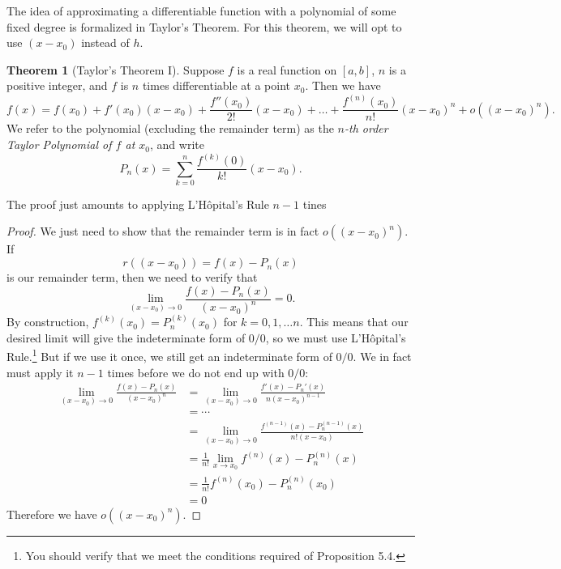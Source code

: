 \documentclass{article}
\theoremstyle{definition}
\newtheorem{theorem}{Theorem}[section]
\begin{document}
	The idea of approximating a differentiable function with a polynomial of some fixed degree is formalized in Taylor's Theorem. For this theorem, we will opt to use $ (x-x_0) $ instead of $ h $.
	\begin{theorem}[Taylor's Theorem I]
		Suppose $ f $ is a real function on $ [a,b] $, $ n $ is a positive integer, and $ f $ is $ n $ times differentiable at a point $ x_0 $. Then we have $$ f(x)=f(x_0)+f'(x_0)(x-x_0)+\frac{f''(x_0)}{2!}(x-x_0)+\ldots+\frac{f^{(n)}(x_0)}{n!}(x-x_0)^n+o((x-x_0)^n).$$ We refer to the polynomial (excluding the remainder term) as the \textit{\color{red}$ n $-th order Taylor Polynomial of $ f $ at $ x_0 $}, and write $$ P_n(x)=\sum_{k=0}^{n}\frac{f^{(k)}(0)}{k!}(x-x_0) .$$
	\end{theorem}
	The proof just amounts to applying L'H\^{o}pital's Rule $ n-1 $ tines
	\begin{proof}
		We just need to show that the remainder term is in fact $ o((x-x_0)^n) $. If $$ r((x-x_0))=f(x)-P_n(x) $$ is our remainder term, then we need to verify that $$ \lim\limits_{(x-x_0)\to 0}\frac{f(x)-P_n(x)}{(x-x_0)^n}=0.$$ By construction, $ f^{(k)}(x_0)=P_n^{(k)}(x_0) $ for $ k=0,1,\ldots n $. This means that our desired limit will give the indeterminate form of $ 0/0 $, so we must use L'H\^{o}pital's Rule.\footnote{You should verify that we meet the conditions required of Proposition 5.4.} But if we use it once, we still get an indeterminate form of $ 0/0 $. We in fact must apply it $ n-1 $ times before we do not end up with $ 0/0 $:
		\begin{align*}
			\lim\limits_{(x-x_0)\to 0}\frac{f(x)-P_n(x)}{(x-x_0)^n}&=\lim\limits_{(x-x_0)\to 0}\frac{f'(x)-P_n'(x)}{n(x-x_0)^{n-1}}\\
			&=\cdots\\
			&=\lim\limits_{(x-x_0)\to 0}\frac{f^{(n-1)}(x)-P_n^{(n-1)}(x)}{n!(x-x_0)}\\
			&=\frac{1}{n!}\lim\limits_{x\to x_0}{f^{(n)}(x)-P_n^{(n)}(x)}\\
			&=\frac{1}{n!}f^{(n)}(x_0)-P_n^{(n)}(x_0)\\
			&=0
		\end{align*}
		Therefore we have  $ o((x-x_0)^n) $. 
	\end{proof}
\end{document}
